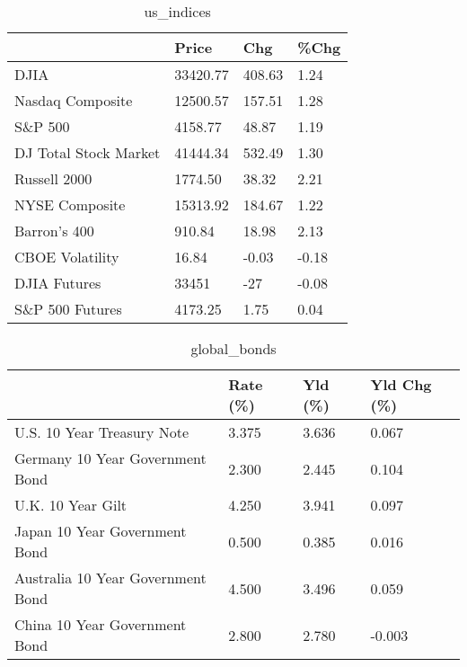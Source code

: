 \documentclass{article}%
\begin{document}
%


\begin{table}[htbp]%
\caption{us\_indices}%
\centering%
\begin{adjustbox}{width=1\textwidth}%
\begin{tabular}{llll}
\toprule
                      &    Price &    Chg &  \%Chg \\
\midrule
                 DJIA & 33420.77 & 408.63 &  1.24 \\
     Nasdaq Composite & 12500.57 & 157.51 &  1.28 \\
              S\&P 500 &  4158.77 &  48.87 &  1.19 \\
DJ Total Stock Market & 41444.34 & 532.49 &  1.30 \\
         Russell 2000 &  1774.50 &  38.32 &  2.21 \\
       NYSE Composite & 15313.92 & 184.67 &  1.22 \\
         Barron's 400 &   910.84 &  18.98 &  2.13 \\
      CBOE Volatility &    16.84 &  -0.03 & -0.18 \\
         DJIA Futures &    33451 &    -27 & -0.08 \\
      S\&P 500 Futures &  4173.25 &   1.75 &  0.04 \\
\bottomrule
\end{tabular}
%
\end{adjustbox}%
\end{table}

%


\begin{table}[htbp]%
\caption{global\_bonds}%
\centering%
\begin{adjustbox}{width=1\textwidth}%
\begin{tabular}{llll}
\toprule
                                  & Rate (\%) & Yld (\%) & Yld Chg (\%) \\
\midrule
       U.S. 10 Year Treasury Note &    3.375 &   3.636 &       0.067 \\
  Germany 10 Year Government Bond &    2.300 &   2.445 &       0.104 \\
                U.K. 10 Year Gilt &    4.250 &   3.941 &       0.097 \\
    Japan 10 Year Government Bond &    0.500 &   0.385 &       0.016 \\
Australia 10 Year Government Bond &    4.500 &   3.496 &       0.059 \\
    China 10 Year Government Bond &    2.800 &   2.780 &      -0.003 \\
\bottomrule
\end{tabular}
%
\end{adjustbox}%
\end{table}
\end{document}
